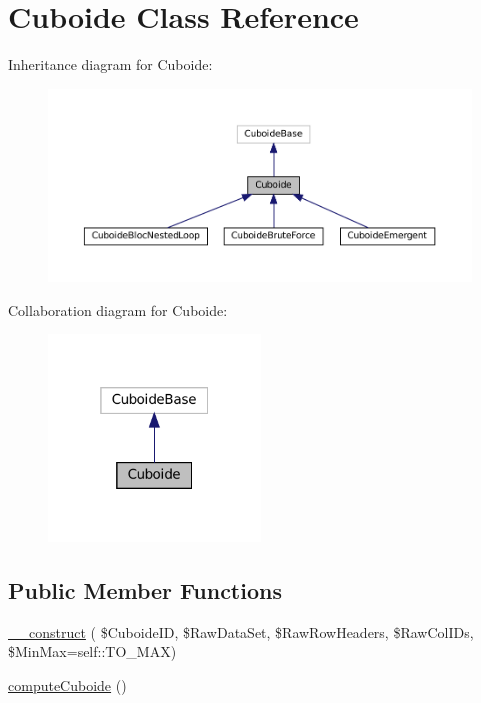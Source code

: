 \hypertarget{class_cuboide}{}\section{Cuboide Class Reference}
\label{class_cuboide}


Inheritance diagram for Cuboide\+:\nopagebreak
\begin{figure}[H]
\begin{center}
\leavevmode
\includegraphics[width=350pt]{class_cuboide__inherit__graph}
\end{center}
\end{figure}


Collaboration diagram for Cuboide\+:\nopagebreak
\begin{figure}[H]
\begin{center}
\leavevmode
\includegraphics[width=160pt]{class_cuboide__coll__graph}
\end{center}
\end{figure}
\subsection*{Public Member Functions}
\begin{DoxyCompactItemize}
\item 
\hyperlink{class_cuboide_af2d05516a10563902f1e13a2f387e90b}{\+\_\+\+\_\+construct} ( \$Cuboide\+ID, \$Raw\+Data\+Set, \$Raw\+Row\+Headers, \$Raw\+Col\+I\+Ds, \$Min\+Max=self\+::\+T\+O\+\_\+\+M\+AX)
\item 
\hyperlink{class_cuboide_a53d2c94aad8c0cde1a7e3492bd94914d}{compute\+Cuboide} ()
\end{DoxyCompactItemize}

